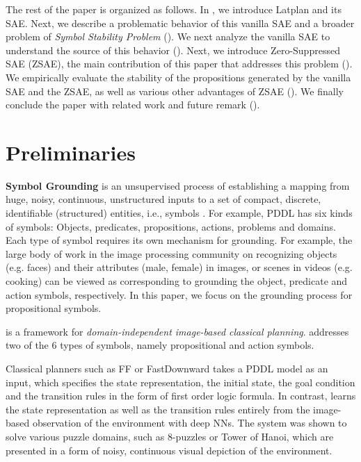The rest of the paper is organized as follows.
In , we introduce Latplan \cite{Asai2018} and its SAE.
Next, we describe a problematic behavior of this vanilla SAE and
a broader problem of \emph{Symbol Stability Problem} ().
We next analyze the vanilla SAE to understand the source of this behavior ().
Next, we introduce Zero-Suppressed SAE (ZSAE), the main contribution of this paper that addresses this problem ().
We empirically evaluate the stability of the propositions generated by the vanilla SAE and the ZSAE,
as well as various other advantages of ZSAE ().
We finally conclude the paper with related work and future remark ().


\section{Preliminaries}
\label{background}

\textbf{Symbol Grounding} is an unsupervised process of establishing a mapping
from huge, noisy, continuous, unstructured inputs
to a set of compact, %
discrete, identifiable (structured) entities, i.e., symbols \cite{Asai2018}.
For example, PDDL has six kinds of symbols: Objects, predicates, propositions, actions, problems and domains.
Each type of symbol requires its own mechanism for grounding.
For example, the large body of work in the image processing community on recognizing 
objects (e.g. faces) and their attributes (male, female) in images, or scenes in videos (e.g. cooking)
can be viewed as corresponding to grounding the object, predicate and action symbols, respectively.
In this paper, we focus on the grounding process for propositional symbols.

\textbf{\latentplanner} \cite{Asai2018} is a framework for
\emph{domain-independent image-based classical planning}.
\latentplanner addresses two of the 6 types of symbols, %
namely propositional and action symbols.

Classical planners such as FF \cite{Hoffmann01} or
FastDownward \cite{Helmert04} takes a PDDL model as an input, which
specifies the state representation, the initial state, the goal
condition and the transition rules in the form of first order logic
formula.  In contrast, \latentplanner learns the state representation as well as the transition rules
entirely from the image-based observation of the environment with deep NNs.
The system was shown to solve various puzzle domains, such as 8-puzzles or Tower of Hanoi,
which are presented in a form of noisy, continuous visual depiction of the environment.

